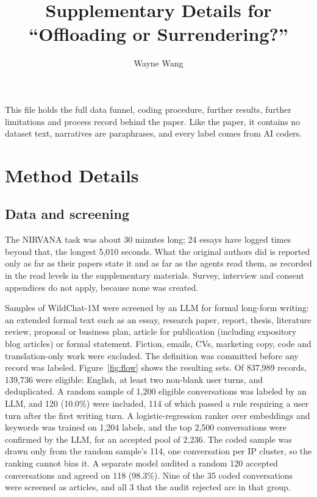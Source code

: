 \documentclass[manuscript,screen]{acmart}
\begin{document}
\title[Offloading or Surrendering? Supplementary Details]{Supplementary Details for ``Offloading or Surrendering?''}
\author{Wayne Wang}
\maketitle
\renewcommand{\thefigure}{S\arabic{figure}}\renewcommand{\thetable}{S\arabic{table}}

This file holds the full data funnel, coding procedure, further results, further limitations and process record behind the paper. Like the paper, it contains no dataset text, narratives are paraphrases, and every label comes from AI coders.

\section{Method Details}

\subsection{Data and screening}

The NIRVANA task was about 30 minutes long; 24 essays have logged times beyond that, the longest 5,010 seconds. What the original authors did is reported only as far as their papers state it and as far as the agents read them, as recorded in the read levels in the supplementary materials. Survey, interview and consent appendices do not apply, because none was created.

Samples of WildChat-1M were screened by an LLM for formal long-form writing: an extended formal text such as an essay, research paper, report, thesis, literature review, proposal or business plan, article for publication (including expository blog articles) or formal statement. Fiction, emails, CVs, marketing copy, code and translation-only work were excluded. The definition was committed before any record was labeled. Figure~\ref{fig:flow} shows the resulting sets. Of 837,989 records, 139,736 were eligible: English, at least two non-blank user turns, and deduplicated. A random sample of 1,200 eligible conversations was labeled by an LLM, and 120 (10.0\%) were included, 114 of which passed a rule requiring a user turn after the first writing turn. A logistic-regression ranker over embeddings and keywords was trained on 1,204 labels, and the top 2,500 conversations were confirmed by the LLM, for an accepted pool of 2,236. The coded sample was drawn only from the random sample's 114, one conversation per IP cluster, so the ranking cannot bias it. A separate model audited a random 120 accepted conversations and agreed on 118 (98.3\%). Nine of the 35 coded conversations were screened as articles, and all 3 that the audit rejected are in that group.
\end{document}
